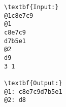 \begin{verbatim}
\textbf{Input:}
@1c8e7c9
@1
c8e7c9
d7b5e1
@2
d9
3 1

\textbf{Output:}
@1: c8e7c9d7b5e1
@2: d8\end{verbatim}